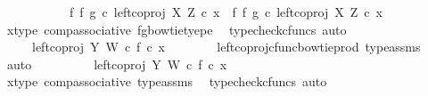 \begin{isabellebody}
\ \ \isamarkupfalse%
\ {\isacharminus}{\kern0pt}\ \isanewline
\ \ \ \ \isamarkupfalse%
\ {\isachardoublequoteopen}{\isacharparenleft}{\kern0pt}f\ {\isasymbowtie}\isactrlsub f\ g{\isacharparenright}{\kern0pt}\ {\isasymcirc}\isactrlsub c\ left{\isacharunderscore}{\kern0pt}coproj\ X\ Z\ {\isasymcirc}\isactrlsub c\ x\ {\isacharequal}{\kern0pt}\ {\isacharparenleft}{\kern0pt}{\isacharparenleft}{\kern0pt}f\ {\isasymbowtie}\isactrlsub f\ g{\isacharparenright}{\kern0pt}\ {\isasymcirc}\isactrlsub c\ left{\isacharunderscore}{\kern0pt}coproj\ X\ Z{\isacharparenright}{\kern0pt}\ {\isasymcirc}\isactrlsub c\ x{\isachardoublequoteclose}\isanewline
\ \ \ \ \ \ \isamarkupfalse%
\ x{\isacharunderscore}{\kern0pt}type{}\ comp{\isacharunderscore}{\kern0pt}associative{}\ fg{\isacharunderscore}{\kern0pt}bowtie{\isacharunderscore}{\kern0pt}tyepe\ \isamarkupfalse%
\ {\isacharparenleft}{\kern0pt}typecheck{\isacharunderscore}{\kern0pt}cfuncs{\isacharcomma}{\kern0pt}\ auto{\isacharparenright}{\kern0pt}\isanewline
\ \ \ \ \isamarkupfalse%
\ \isamarkupfalse%
\ \ {\isachardoublequoteopen}{\isachardot}{\kern0pt}{\isachardot}{\kern0pt}{\isachardot}{\kern0pt}\ {\isacharequal}{\kern0pt}\ \ {\isacharparenleft}{\kern0pt}left{\isacharunderscore}{\kern0pt}coproj\ Y\ W\ {\isasymcirc}\isactrlsub c\ f{\isacharparenright}{\kern0pt}\ {\isasymcirc}\isactrlsub c\ x{\isachardoublequoteclose}\isanewline
\ \ \ \ \ \ \isamarkupfalse%
\ left{\isacharunderscore}{\kern0pt}coproj{\isacharunderscore}{\kern0pt}cfunc{\isacharunderscore}{\kern0pt}bowtie{\isacharunderscore}{\kern0pt}prod\ type{\isacharunderscore}{\kern0pt}assms\ \isamarkupfalse%
\ auto\isanewline
\ \ \ \ \isamarkupfalse%
\ \isamarkupfalse%
\ {\isachardoublequoteopen}{\isachardot}{\kern0pt}{\isachardot}{\kern0pt}{\isachardot}{\kern0pt}\ {\isacharequal}{\kern0pt}\ left{\isacharunderscore}{\kern0pt}coproj\ Y\ W\ {\isasymcirc}\isactrlsub c\ f\ {\isasymcirc}\isactrlsub c\ x{\isachardoublequoteclose}\isanewline
\ \ \ \ \ \ \isamarkupfalse%
\ x{\isacharunderscore}{\kern0pt}type{}\ comp{\isacharunderscore}{\kern0pt}associative{}\ type{\isacharunderscore}{\kern0pt}assms{\isacharparenleft}{\kern0pt}{}{\isacharparenright}{\kern0pt}\ \isamarkupfalse%
\ {\isacharparenleft}{\kern0pt}typecheck{\isacharunderscore}{\kern0pt}cfuncs{\isacharcomma}{\kern0pt}\ auto{\isacharparenright}{\kern0pt}\isanewline
\ \ \ \ \isamarkupfalse%

\end{isabellebody}
